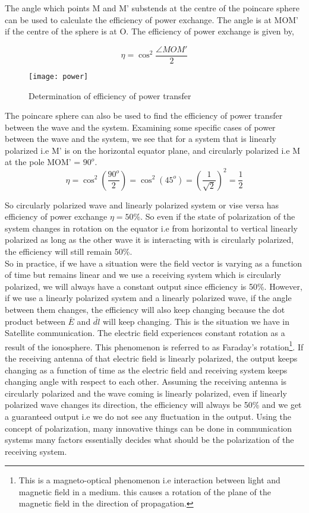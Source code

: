 	The angle which points M and M' substends at the centre of the poincare sphere can be used to calculate the efficiency of power exchange.
	The angle is at MOM' if the centre of the sphere is at O. The efficiency of power exchange is given by,
	
	\[\eta = \cos^2 {\frac{ \angle  MOM' }{2}}  \]
	
	\begin{figure}
		\centering
		\texttt{[image: power]}
		\caption{Determination of efficiency of power transfer}
		\label{fig:power}
	\end{figure}
	
	
	
	
	The poincare sphere can also be used to find the efficiency of power transfer between the wave and the system. Examining some specific cases of power between the wave and the system, we see that for a system that is linearly polarized i.e M' is on the horizontal equator plane, and circularly polarized i.e M at the pole MOM' = $ 90^o $.\\
	\[ \eta= \cos ^2(\frac{90^o}{2}) =\cos ^2(45^o) =(\frac{1}{\sqrt{2}})^2  = \frac{1}{2}\]
	
	So circularly polarized wave and linearly polarized system or vise versa has efficiency of power exchange $ \eta=  50\% $. So even if the state of polarization of the system changes in rotation on the equator i.e from horizontal to vertical linearly polarized as long as the other wave it is interacting with is circularly polarized, the efficiency will still remain 50\%.\\
	
	So in practice, if we have a situation were the field vector is varying as a function of time but remains linear and we use a receiving system which is circularly polarized, we will always have a constant output since efficiency is 50\%. However, if we use a linearly polarized system and a linearly polarized wave, if the angle between them changes, the efficiency will also keep changing because the dot product between $ \bar {E} $ and $ \bar{dl} $ will keep changing. This is the situation we have in Satellite communication. The electric field experiences constant rotation as a result of the ionosphere. This phenomenon is referred to as Faraday's rotation\footnote{This is a magneto-optical phenomenon i.e interaction between light and magnetic field in a medium. this causes a rotation of the plane of the magnetic field in the direction of propagation.}. If the receiving antenna of that electric field is linearly polarized, the output keeps changing as a function of time as the electric field and receiving system keeps changing angle with respect to each other. Assuming the receiving antenna is circularly polarized and the wave coming is linearly polarized, even if linearly polarized wave changes its direction, the efficiency will always be 50\% and we get a guaranteed output i.e we do not see any fluctuation in the output. Using the concept of polarization, many innovative things can be done in communication systems many factors essentially decides what should be the polarization of the receiving system.\\
	
